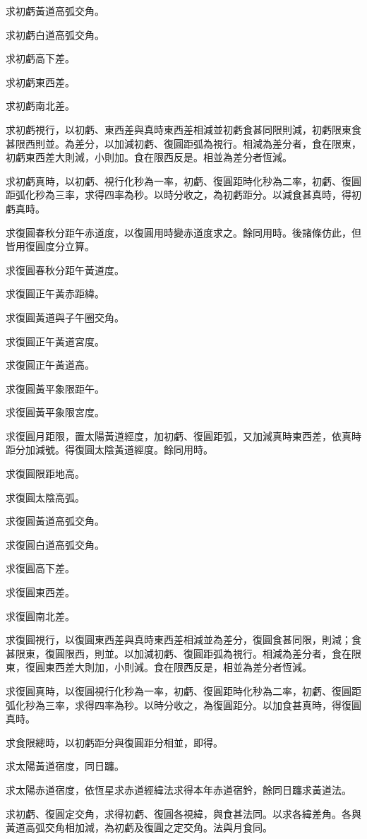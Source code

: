 \begin{pinyinscope}
求初虧黃道高弧交角。

求初虧白道高弧交角。

求初虧高下差。

求初虧東西差。

求初虧南北差。

求初虧視行，以初虧、東西差與真時東西差相減並初虧食甚同限則減，初虧限東食甚限西則並。為差分，以加減初虧、復圓距弧為視行。相減為差分者，食在限東，初虧東西差大則減，小則加。食在限西反是。相並為差分者恆減。

求初虧真時，以初虧、視行化秒為一率，初虧、復圓距時化秒為二率，初虧、復圓距弧化秒為三率，求得四率為秒。以時分收之，為初虧距分。以減食甚真時，得初虧真時。

求復圓春秋分距午赤道度，以復圓用時變赤道度求之。餘同用時。後諸條仿此，但皆用復圓度分立算。

求復圓春秋分距午黃道度。

求復圓正午黃赤距緯。

求復圓黃道與子午圈交角。

求復圓正午黃道宮度。

求復圓正午黃道高。

求復圓黃平象限距午。

求復圓黃平象限宮度。

求復圓月距限，置太陽黃道經度，加初虧、復圓距弧，又加減真時東西差，依真時距分加減號。得復圓太陰黃道經度。餘同用時。

求復圓限距地高。

求復圓太陰高弧。

求復圓黃道高弧交角。

求復圓白道高弧交角。

求復圓高下差。

求復圓東西差。

求復圓南北差。

求復圓視行，以復圓東西差與真時東西差相減並為差分，復圓食甚同限，則減；食甚限東，復圓限西，則並。以加減初虧、復圓距弧為視行。相減為差分者，食在限東，復圓東西差大則加，小則減。食在限西反是，相並為差分者恆減。

求復圓真時，以復圓視行化秒為一率，初虧、復圓距時化秒為二率，初虧、復圓距弧化秒為三率，求得四率為秒。以時分收之，為復圓距分。以加食甚真時，得復圓真時。

求食限總時，以初虧距分與復圓距分相並，即得。

求太陽黃道宿度，同日躔。

求太陽赤道宿度，依恆星求赤道經緯法求得本年赤道宿鈐，餘同日躔求黃道法。

求初虧、復圓定交角，求得初虧、復圓各視緯，與食甚法同。以求各緯差角。各與黃道高弧交角相加減，為初虧及復圓之定交角。法與月食同。


\end{pinyinscope}
